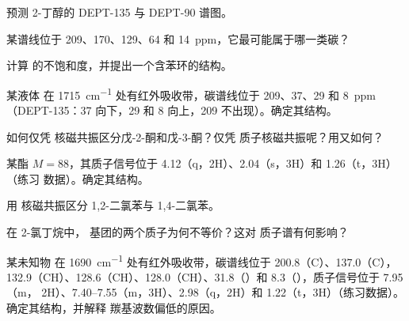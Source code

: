\begin{exercise}[$\star$]\label{exo:b2:structure-determination:2}
预测 2-丁醇的 DEPT-135 与 DEPT-90 谱图。
\end{exercise}

\begin{exercise}[$\star$]\label{exo:b2:structure-determination:3}
某谱线位于 209、170、129、64 和 14~ppm，它最可能属于哪一类碳？
\end{exercise}

\begin{exercise}[$\star$]\label{exo:b2:structure-determination:4}
计算  的不饱和度，并提出一个含苯环的结构。
\end{exercise}

\begin{exercise}[$\star\star$]\label{exo:b2:structure-determination:5}
某液体  在 \qty{1715}{cm^{-1}} 处有红外吸收带，碳谱线位于 209、37、29 和 8~ppm
（DEPT-135：37 向下，29 和 8 向上，209 不出现）。确定其结构。
\end{exercise}

\begin{exercise}[$\star\star$]\label{exo:b2:structure-determination:6}
如何仅凭  核磁共振区分戊-2-酮和戊-3-酮？仅凭
质子核磁共振呢？用又如何？
\end{exercise}

\begin{exercise}[$\star\star$]\label{exo:b2:structure-determination:7}
某酯 $M = 88$，其质子信号位于 4.12（q，2H）、2.04（s，3H）和 1.26（t，3H）（练习
数据）。确定其结构。
\end{exercise}

\begin{exercise}[$\star\star$]\label{exo:b2:structure-determination:8}
用  核磁共振区分 1,2-二氯苯与 1,4-二氯苯。
\end{exercise}

\begin{exercise}[$\star\star$]\label{exo:b2:structure-determination:9}
在 2-氯丁烷中， 基团的两个质子为何不等价？这对
质子谱有何影响？
\end{exercise}

\begin{exercise}[$\star\star\star$]\label{exo:b2:structure-determination:10}
某未知物  在 \qty{1690}{cm^{-1}} 处有红外吸收带，碳谱线位于 200.8（C）、137.0（C），
132.9（CH）、128.6（CH）、128.0（CH）、31.8（）和 8.3（），质子信号位于 7.95（m，
2H）、7.40--7.55（m，3H）、2.98（q，2H）和 1.22（t，3H）（练习数据）。确定其结构，并解释
羰基波数偏低的原因。
\end{exercise}


